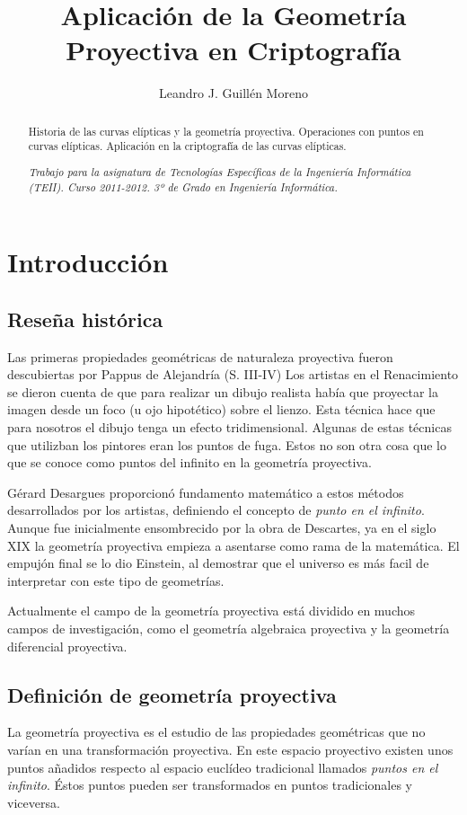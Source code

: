 \documentclass[a4,12pt]{article}
\title{Aplicación de la Geometría Proyectiva en Criptografía}
\author{Leandro J. Guillén Moreno}
\date{}
\begin{document}
\maketitle

\begin{abstract}
Historia de las curvas elípticas y la geometría proyectiva. Operaciones con puntos en curvas elípticas. Aplicación en la criptografía de las curvas elípticas.

\emph{Trabajo para la asignatura de Tecnologías Específicas de la Ingeniería Informática (TEII). Curso 2011-2012. 3º de Grado en Ingeniería Informática.}
\end{abstract}
\newpage %
\tableofcontents
\newpage
\section{Introducción}
\subsection{Reseña histórica}
Las primeras propiedades geométricas de naturaleza proyectiva fueron descubiertas por Pappus de Alejandría (S. III-IV)
Los artistas en el Renacimiento se dieron cuenta de que para realizar un dibujo realista había que proyectar la imagen desde un foco (u ojo hipotético) sobre el lienzo. Esta técnica hace que para nosotros el dibujo tenga un efecto tridimensional. Algunas de estas técnicas que utilizban los pintores eran los puntos de fuga. Estos no son otra cosa que lo que se conoce como puntos del infinito en la geometría proyectiva.

Gérard Desargues proporcionó fundamento matemático\cite{desargues} a estos métodos desarrollados por los artistas, definiendo el concepto de \emph{punto en el infinito}. Aunque fue inicialmente ensombrecido por la obra de Descartes, ya en el siglo XIX la geometría proyectiva empieza a asentarse como rama de la matemática. El empujón final se lo dio Einstein, al demostrar que el universo es más facil de interpretar con este tipo de geometrías.

Actualmente el campo de la geometría proyectiva está dividido en muchos campos de investigación, como el geometría algebraica proyectiva y la geometría diferencial proyectiva.

\subsection{Definición de geometría proyectiva}
La geometría proyectiva es el estudio de las propiedades geométricas que no varían en una transformación proyectiva. En este espacio proyectivo existen unos puntos añadidos respecto al espacio euclídeo tradicional llamados \emph{puntos en el infinito}. Éstos puntos pueden ser transformados en puntos tradicionales y viceversa.
\end{document}
